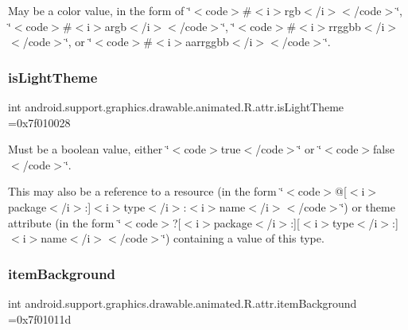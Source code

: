 May be a color value, in the form of \char`\"{}$<$code$>$\#$<$i$>$rgb$<$/i$>$$<$/code$>$\char`\"{}, \char`\"{}$<$code$>$\#$<$i$>$argb$<$/i$>$$<$/code$>$\char`\"{}, \char`\"{}$<$code$>$\#$<$i$>$rrggbb$<$/i$>$$<$/code$>$\char`\"{}, or \char`\"{}$<$code$>$\#$<$i$>$aarrggbb$<$/i$>$$<$/code$>$\char`\"{}. \mbox{\label{classandroid_1_1support_1_1graphics_1_1drawable_1_1animated_1_1R_1_1attr_a1eb93aa3ecb74427d52d0805319ca1d7}} 
\subsubsection{\texorpdfstring{is\+Light\+Theme}{isLightTheme}}
{\footnotesize\ttfamily int android.\+support.\+graphics.\+drawable.\+animated.\+R.\+attr.\+is\+Light\+Theme =0x7f010028\hspace{0.3cm}{\ttfamily [static]}}

Must be a boolean value, either \char`\"{}$<$code$>$true$<$/code$>$\char`\"{} or \char`\"{}$<$code$>$false$<$/code$>$\char`\"{}. 

This may also be a reference to a resource (in the form \char`\"{}$<$code$>$@\mbox{[}$<$i$>$package$<$/i$>$\+:\mbox{]}$<$i$>$type$<$/i$>$\+:$<$i$>$name$<$/i$>$$<$/code$>$\char`\"{}) or theme attribute (in the form \char`\"{}$<$code$>$?\mbox{[}$<$i$>$package$<$/i$>$\+:\mbox{]}\mbox{[}$<$i$>$type$<$/i$>$\+:\mbox{]}$<$i$>$name$<$/i$>$$<$/code$>$\char`\"{}) containing a value of this type. \mbox{\label{classandroid_1_1support_1_1graphics_1_1drawable_1_1animated_1_1R_1_1attr_a46deef0c66e8fee0eb05a6b1970a8cd3}} 
\subsubsection{\texorpdfstring{item\+Background}{itemBackground}}
{\footnotesize\ttfamily int android.\+support.\+graphics.\+drawable.\+animated.\+R.\+attr.\+item\+Background =0x7f01011d\hspace{0.3cm}{\ttfamily [static]}}

